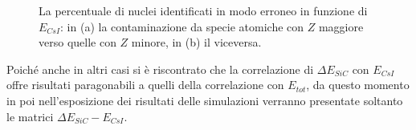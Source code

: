 \begin{figure}[!p] 
	\centering
	\hspace{10mm}
	\caption{La percentuale di nuclei identificati in modo erroneo in funzione di $E_{CsI}$: in (a) la contaminazione da specie atomiche con $Z$ maggiore verso quelle con $Z$ minore, in (b) il viceversa.} \label{fig:leakage_res}
\end{figure}

Poiché anche in altri casi si è riscontrato che la correlazione di $\Delta E_{SiC}$ con $E_{CsI}$ offre risultati paragonabili a quelli della correlazione con $E_{tot}$, da questo momento in poi nell'esposizione dei risultati delle simulazioni verranno presentate soltanto le matrici $\Delta E_{SiC} - E_{CsI}$.










